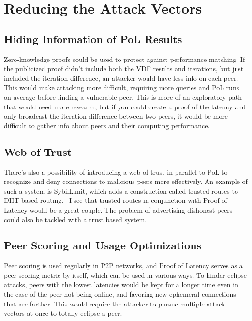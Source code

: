 \section{Reducing the Attack Vectors}
\subsection{Hiding Information of PoL Results}
Zero-knowledge proofs could be used to protect against performance matching. If the publicized proof didn't include both the VDF results and iterations, but just included the iteration difference, an attacker would have less info on each peer. This would make attacking more difficult, requiring more queries and PoL runs on average before finding a vulnerable peer. This is more of an exploratory path that would need more research, but if you could create a proof of the latency and only broadcast the iteration difference between two peers, it would be more difficult to gather info about peers and their computing performance.

\subsection{Web of Trust}
There's also a possibility of introducing a web of trust in parallel to PoL to recognize and deny connections to malicious peers more effectively. An example of such a system is SybilLimit, which adds a construction called trusted routes to DHT based routing.~\cite{Yu2008-xl} I see that trusted routes in conjunction with Proof of Latency would be a great couple. The problem of advertising dishonest peers could also be tackled with a trust based system.

\subsection{Peer Scoring and Usage Optimizations}
Peer scoring is used regularly in P2P networks, and Proof of Latency serves as a peer scoring metric by itself, which can be used in various ways. To hinder eclipse attacks, peers with the lowest latencies would be kept for a longer time even in the case of the peer not being online, and favoring new ephemeral connections that are farther. This would require the attacker to pursue multiple attack vectors at once to totally eclipse a peer.

